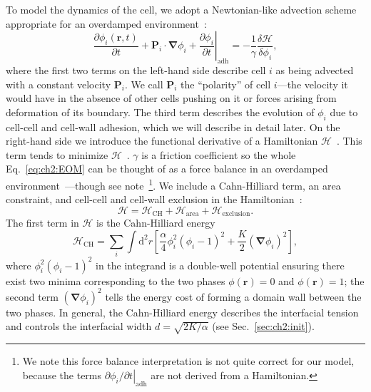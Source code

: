 To model the dynamics of the cell, we adopt a Newtonian-like advection scheme appropriate for an overdamped environment~\cite{loewe2020solid, mueller2019emergence}:
\begin{equation}\label{eq:ch2:EOM}
    \frac{\partial\phi_i(\mathbf{r},t)}{\partial t}+\mathbf{P}_i\cdot\bm{\nabla}\phi_i
    +\left.\frac{\partial\phi_i}{\partial t}\right|_\textrm{adh}
    =-\frac{1}{\gamma}\frac{\delta\mathcal{H}}{\delta\phi_i},
\end{equation}
where the first two terms on the left-hand side describe cell $i$ as being advected with a constant velocity $\mathbf{P}_i$.
We call $\mathbf{P}_i$ the ``polarity'' of cell $i$---the velocity it would have in the absence of other cells pushing on it or forces arising from deformation of its boundary.
The third term describes the evolution of $\phi_i$ due to cell-cell and cell-wall adhesion, which we will describe in detail later.
On the right-hand side we introduce the functional derivative of a Hamiltonian $\mathcal{H}$~\cite{bitbol2011forces, zhang2020active, mueller2019emergence}.
This term tends to minimize $\mathcal{H}$~\cite{palmieri2015multiple}.
$\gamma$ is a friction coefficient so the whole Eq.~\eqref{eq:ch2:EOM} can be thought of as a force balance in an overdamped environment~\cite{shao2010computational}---though see note~\footnote{We note this force balance interpretation is not quite correct for our model, because the terms $\left.\partial\phi_i/\partial t\right|_\textrm{adh}$ are not derived from a Hamiltonian.}.
We include a Cahn-Hilliard term, an area constraint, and cell-cell and cell-wall exclusion in the Hamiltonian~\cite{loewe2020solid, mueller2019emergence}:
\begin{equation}\label{eq:ch2:Hamiltonian}
\mathcal{H}=\mathcal{H}_{\text{CH}}+\mathcal{H}_{\text{area}}+\mathcal{H}_{\text{exclusion}}.
\end{equation}
The first term in $\mathcal{H}$ is the Cahn-Hilliard energy~\cite{mueller2019emergence, zhang2020active}
\begin{equation*}
\mathcal{H}_{\text{CH}}=\sum_i\int\mathrm{d}^2 r\left[\frac{\alpha}{4}\phi_i^2(\phi_i-1)^2+\frac{K}{2}(\bm{\nabla}\phi_i)^2\right],
\end{equation*}
where $\phi_i^2(\phi_i-1)^2$ in the integrand is a double-well potential ensuring there exist two minima corresponding to the two phases $\phi(\mathbf r)=0$ and $\phi(\mathbf r)=1$; the second term $(\bm{\nabla}\phi_i)^2$ tells the energy cost of forming a domain wall between the two phases.
In general, the Cahn-Hilliard energy describes the interfacial tension~\cite{brown2008elastic} and controls the interfacial width $d=\sqrt{2K/\alpha}$ (see Sec.~\ref{sec:ch2:init}).
